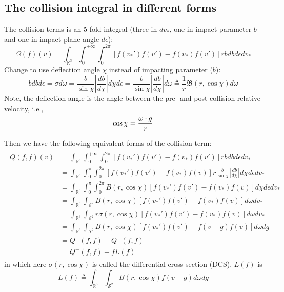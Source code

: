 \documentclass[11pt]{amsart}
\begin{document}
\subsection{The collision integral in different forms}
 The collision terms is an 5-fold integral (three in $dv_*$, one in impact parameter $b$ and one in impact plane angle $d\epsilon$):
\begin{equation}
\Omega(f)(v) 
=  \int_{\mathbb{R}^3} \int_0^{+\infty} \int_0^{2\pi} [f(v_*')f(v')-f(v_*)f(v')] r bdbd\epsilon dv_* 
\end{equation}
Change to use deflection angle $\chi$ instead of impacting parameter ($b$):
\begin{equation}
bdbd\epsilon =  \sigma d\omega  = \frac{b}{\sin\chi}\left|\frac{db}{d\chi}\right|d\chi d\epsilon 
		   = \frac{b}{\sin \chi} \left|\frac{db}{d\chi}\right|d\omega 
		   \triangleq  \frac{1}{r} \mathfrak{B}(r,\cos\chi) d\omega
\end{equation}
Note, the deflection angle is the angle between the pre- and post-collision relative velocity, i.e.,
\begin{equation}
\cos \chi = {\omega \cdot g \over r}
\end{equation}

Then we have the following equivalent forms of the collision term:
\begin{align}
\begin{split}
Q(f,f)(v) 
&=  \int_{\mathbb{R}^3} \int_0^{+\infty} \int_0^{2\pi} [f(v_*')f(v')-f(v_*)f(v')] r bdbd\epsilon dv_* \\
&=  \int_{\mathbb{R}^3} \int_0^{\pi} \int_0^{2\pi} [f(v_*')f(v')-f(v_*)f(v)] r \frac{b}{\sin \chi} \left|\frac{db}{d\chi} \right| d\chi d\epsilon dv_* \\
&=  \int_{\mathbb{R}^3} \int_0^{\pi} \int_0^{2\pi} {B}(r,\cos\chi)[f(v_*')f(v')-f(v_*)f(v)] d\chi d\epsilon dv_* \\
&=  \int_{\mathbb{R}^3} \int_{\mathcal{S}^2} {B}(r,\cos\chi)[f(v_*')f(v')-f(v_*)f(v)] d\omega dv_* \\
&=  \int_{\mathbb{R}^3} \int_{\mathcal{S}^2} r \sigma(r,\cos\chi)[f(v_*')f(v')-f(v_*)f(v)] d\omega dv_* \\
&=  \int_{\mathbb{R}^3} \int_{\mathcal{S}^2} {B}(r,\cos\chi)[f(v_*')f(v')-f(v-g)f(v)]d\omega dg \\
& = Q^{+}(f,f) - Q^{-}(f,f) \\
& = Q^{+}(f,f) - fL(f)
\end{split}
\end{align}
in which here $\sigma(r,\cos\chi)$ is called the differential cross-section (DCS). $L(f)$ is
\begin{equation}
L(f) \triangleq \int_{\mathbb{R}^3} \int_{\mathcal{S}^2} {B}(r,\cos\chi)f(v-g)d\omega dg
\end{equation}
\end{document}
